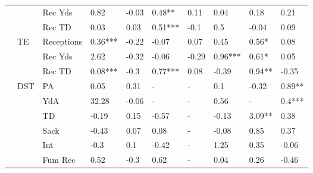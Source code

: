 \documentclass[12pt]{article}
\begin{document}
\begin{table}[H]
\begin{adjustbox}{width =\textwidth}
\begin{tabular}{llllllllll}
{} &          &     Rec Yds &     0.82 &    -0.03 &   0.48** &     0.11 &        0.04 &     0.18 &     0.21 \\
{} &          &      Rec TD &     0.03 &     0.03 &  0.51*** &     -0.1 &         0.5 &    -0.04 &     0.09 \\
{} &       TE &  Receptions &  0.36*** &    -0.22 &    -0.07 &     0.07 &        0.45 &    0.56* &     0.08 \\
{} &          &     Rec Yds &     2.62 &    -0.32 &    -0.06 &    -0.29 &     0.96*** &    0.61* &     0.05 \\
{} &          &      Rec TD &  0.08*** &     -0.3 &  0.77*** &     0.08 &       -0.39 &   0.94** &    -0.35 \\
{} &      DST &          PA &     0.05 &     0.31 &        - &        - &         0.1 &    -0.32 &   0.89** \\
{} &          &         YdA &    32.28 &    -0.06 &        - &        - &        0.56 &        - &   0.4*** \\
{} &          &          TD &    -0.19 &     0.15 &    -0.57 &        - &       -0.13 &   3.09** &     0.38 \\
{} &          &        Sack &    -0.43 &     0.07 &     0.08 &        - &       -0.08 &     0.85 &     0.37 \\
{} &          &         Int &     -0.3 &      0.1 &    -0.42 &        - &        1.25 &     0.35 &    -0.06 \\
{} &          &     Fum Rec &     0.52 &     -0.3 &     0.62 &        - &        0.04 &     0.26 &    -0.46 \\
\bottomrule
\end{tabular}
\end{adjustbox}
\end{table}
\end{document}
